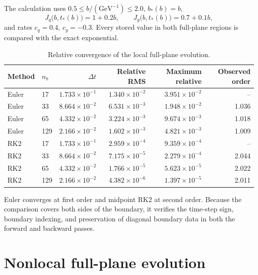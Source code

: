 \documentclass[11pt]{article}
\begin{document}
The calculation uses \(0.5\le b/(\mathrm{GeV}^{-1})\le2.0\),
\(b_*(b)=b\),
\[
  J_q\bigl(b,t_*(b)\bigr)=1+0.2b,\qquad
  J_g\bigl(b,t_*(b)\bigr)=0.7+0.1b,
\]
and rates \(c_q=0.4\), \(c_g=-0.3\). Every stored value in both full-plane
regions is compared with the exact exponential.

\begin{table}[H]
\centering
\caption{Relative convergence of the local full-plane evolution.}
\label{tab:local-results}
\begin{tabular}{llrrrr}
\toprule
Method & \(n_b\) & \(\Delta t\)
  & Relative RMS & Maximum relative & Observed order\\
\midrule
Euler & 17  & \(1.733\times10^{-1}\) & \(1.340\times10^{-2}\) & \(3.951\times10^{-2}\) & --\\
Euler & 33  & \(8.664\times10^{-2}\) & \(6.531\times10^{-3}\) & \(1.948\times10^{-2}\) & 1.036\\
Euler & 65  & \(4.332\times10^{-2}\) & \(3.224\times10^{-3}\) & \(9.674\times10^{-3}\) & 1.018\\
Euler & 129 & \(2.166\times10^{-2}\) & \(1.602\times10^{-3}\) & \(4.821\times10^{-3}\) & 1.009\\
\midrule
RK2 & 17  & \(1.733\times10^{-1}\) & \(2.959\times10^{-4}\) & \(9.359\times10^{-4}\) & --\\
RK2 & 33  & \(8.664\times10^{-2}\) & \(7.175\times10^{-5}\) & \(2.279\times10^{-4}\) & 2.044\\
RK2 & 65  & \(4.332\times10^{-2}\) & \(1.766\times10^{-5}\) & \(5.623\times10^{-5}\) & 2.022\\
RK2 & 129 & \(2.166\times10^{-2}\) & \(4.382\times10^{-6}\) & \(1.397\times10^{-5}\) & 2.011\\
\bottomrule
\end{tabular}
\end{table}

Euler converges at first order and midpoint RK2 at second order. Because the
comparison covers both sides of the boundary, it verifies the time-step sign,
boundary indexing, and preservation of diagonal boundary data in both the
forward and backward passes.

\section{Nonlocal full-plane evolution}
\end{document}
